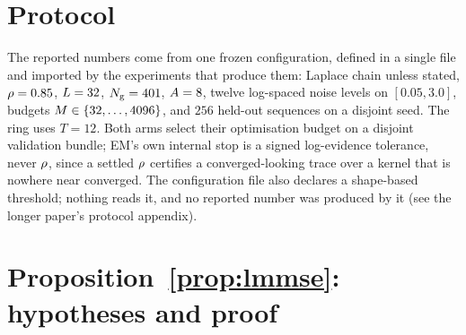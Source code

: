 \section{Protocol}
\label{app:protocol}

The reported numbers come from one frozen configuration, defined in a single file and imported by
the experiments that produce them: Laplace chain unless stated, $\rho=0.85$, $L=32$,
$N_{\mathrm{g}}=401$, $A=8$, twelve log-spaced noise levels on $[0.05,3.0]$, budgets
$M\in\{32,\dots,4096\}$, and $256$ held-out sequences on a disjoint seed. The ring uses $T=12$.
Both arms select their optimisation budget on a disjoint validation bundle; EM's own internal stop
is a signed log-evidence tolerance, never $\rho$, since a settled $\rho$ certifies a
converged-looking trace over a kernel that is nowhere near converged. The configuration file also
declares a shape-based threshold; nothing reads it, and no reported number was produced by it (see
the longer paper's protocol appendix).

\section{Proposition~\ref{prop:lmmse}: hypotheses and proof}
\label{app:ws-lmmse}


